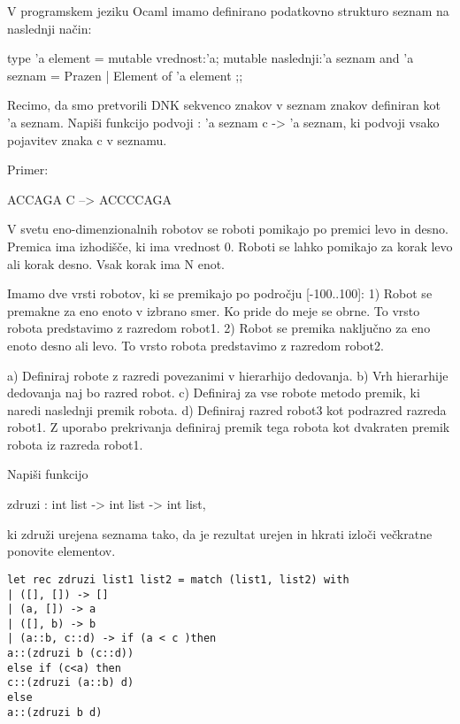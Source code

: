 \begin{ex}
\end{ex} \begin{ex}
V programskem jeziku Ocaml imamo definirano podatkovno strukturo seznam na naslednji na\v cin: 

type 'a element = { 
    mutable vrednost:'a; 
    mutable naslednji:'a seznam 
   }
and 'a seznam = Prazen | Element of 'a element ;;

Recimo, da smo pretvorili DNK sekvenco znakov v seznam znakov definiran kot           'a seznam. Napi\v si funkcijo podvoji : 'a seznam c -> 'a seznam, ki podvoji vsako pojavitev znaka c v seznamu.

Primer:

ACCAGA C --> ACCCCAGA


\end{ex} \begin{ex}
V svetu eno-dimenzionalnih robotov se roboti pomikajo po premici levo in desno. Premica ima izhodi\v s\v ce, ki ima vrednost 0. Roboti se lahko pomikajo za korak levo ali korak desno. Vsak korak ima N enot. 

Imamo dve vrsti robotov, ki se premikajo po podro\v cju [-100..100]: 
1) Robot se premakne za eno enoto v izbrano smer. Ko pride do meje se obrne. To vrsto robota predstavimo z razredom robot1.
2) Robot se premika naklju\v cno za eno enoto desno ali levo. To vrsto robota predstavimo z razredom robot2.

a) Definiraj robote z razredi povezanimi v hierarhijo dedovanja. 
b) Vrh hierarhije dedovanja naj bo razred robot. 
c) Definiraj za vse robote metodo premik, ki naredi naslednji premik robota.
d) Definiraj razred robot3 kot podrazred razreda robot1. Z uporabo prekrivanja definiraj premik tega robota kot dvakraten premik robota iz razreda robot1.




\end{ex} \begin{ex}
Napi\v si funkcijo 

zdruzi : int list -> int list -> int list, 

ki zdru\v zi urejena seznama tako, da je rezultat urejen in hkrati izlo\v ci ve\v ckratne ponovite elementov.

\begin{sol}
\begin{verbatim}
let rec zdruzi list1 list2 = match (list1, list2) with
| ([], []) -> []
| (a, []) -> a
| ([], b) -> b
| (a::b, c::d) -> if (a < c )then 
a::(zdruzi b (c::d))
else if (c<a) then 
c::(zdruzi (a::b) d)
else 
a::(zdruzi b d)
\end{verbatim}
\end{sol}

\end{ex} 

